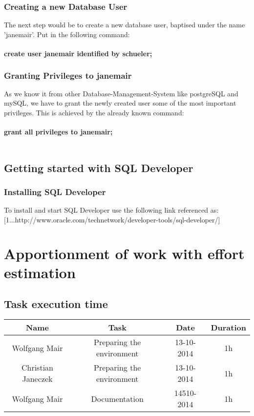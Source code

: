 \documentclass[11pt,a4paper]{article}
\begin{document}
\subsubsection{Creating a new Database User}
The next step would be to create a new database user, baptised under the name 'janemair'. Put in the following command: \\ \\ \textbf{create user janemair identified by schueler;}
\subsubsection{Granting Privileges to janemair}
As we know it from other Database-Management-System like postgreSQL and mySQL, we have to grant the newly created user some of the most important privileges. This is achieved by the already known command: \\ \\ \textbf{grant all privileges to janemair;} \\ \\
\subsection{Getting started with SQL Developer}
\subsubsection{Installing SQL Developer}
To install and start SQL Developer use the following link referenced as: [1...http://www.oracle.com/technetwork/developer-tools/sql-developer/]

\newpage

\section{Apportionment of work with effort estimation}

\subsection{Task execution time}
\begin{table}[h]
\begin{tabular}{@{}|c|c|c|c|@{}}
\toprule
\textbf{Name}         &\textbf{Task}         	 & \textbf{Date} & \textbf{Duration} \\ \midrule
Wolfgang Mair         &Preparing the environment & 13-10-2014    & 1h                \\ \midrule
Christian Janeczek    &Preparing the environment & 13-10-2014    & 1h                \\ \midrule
Wolfgang Mair         &Documentation             & 14510-2014    & 1h             \\ \bottomrule
\end{tabular}
\end{table}
\end{document}
